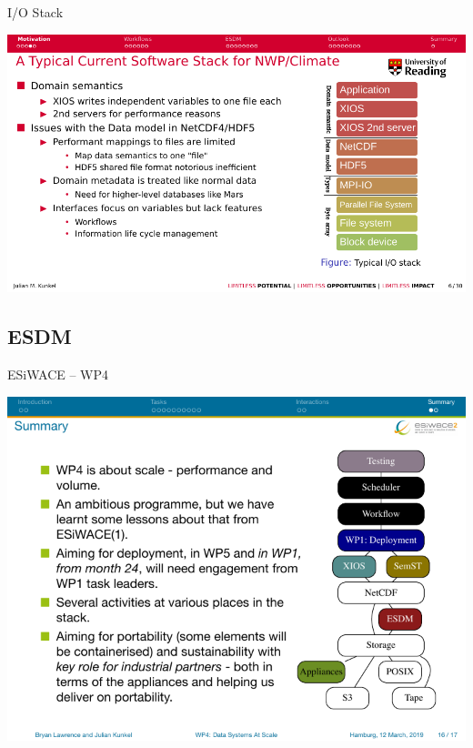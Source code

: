 \documentclass[compress,11pt,xcolor=svgnames,aspectratio=169]{beamer}
\begin{document}
\begin{frame}[fragile]{I/O Stack}

\begin{center}
\includegraphics[scale=0.7]{fig/stack3}
\end{center}

\end{frame}

\subsection{ESDM}

\begin{frame}[fragile]{ESiWACE -- WP4}

\begin{center}
\includegraphics[scale=0.6]{fig/esdm3}
\end{center}

\end{frame}
\end{document}
